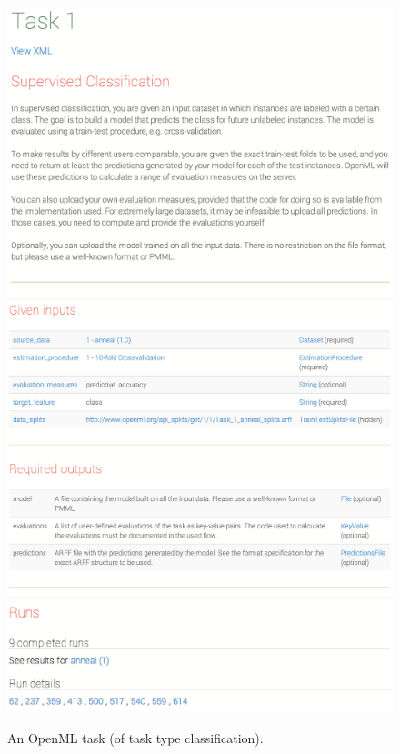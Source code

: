 \documentclass{acmproc-sp}
\begin{document}
\begin{figure}[t!]
\centering
\includegraphics[width=\columnwidth]{openml-taskhead.png}
\includegraphics[width=\columnwidth]{openml-task.png}
\includegraphics[width=\columnwidth]{openml-taskfoot.png}
\caption{\label{fig:task}An OpenML task (of task type  classification).}
\end{figure}
\end{document}
